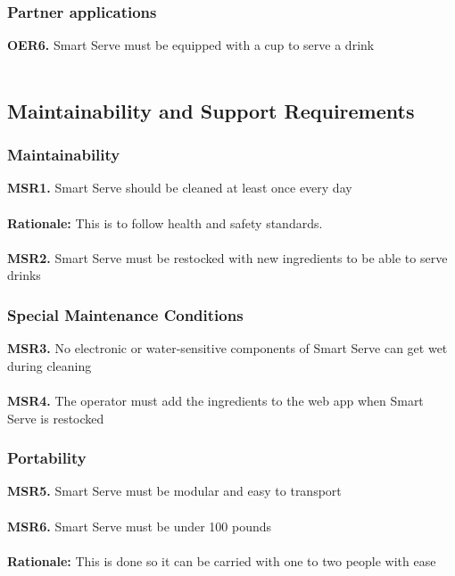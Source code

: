 \documentclass{article}
\begin{document}
    \subsubsection{Partner applications}
        \noindent\textbf{OER6.} Smart Serve must be equipped with a cup to serve a drink \\\\

\subsection{Maintainability and Support Requirements}
    \subsubsection{Maintainability}
        \noindent\textbf{MSR1.} Smart Serve should be cleaned at least once every day \\\\
        \textbf{Rationale:} This is to follow health and safety standards.\\\\
        \textbf{MSR2.} Smart Serve must be restocked with new ingredients to be able to serve drinks \\
    \subsubsection{Special Maintenance Conditions} 
        \noindent\textbf{MSR3.} No electronic or water-sensitive components of Smart Serve can get wet during cleaning \\\\
        \textbf{MSR4.} The operator must add the ingredients to the web app when Smart Serve is restocked \\
    \subsubsection{Portability}
        \noindent\textbf{MSR5.} Smart Serve must be modular and easy to transport \\\\
        \textbf{MSR6.} Smart Serve must be under 100 pounds \\\\
        \indent\textbf{Rationale:} This is done so it can be carried with one to two people with ease\\
\end{document}
